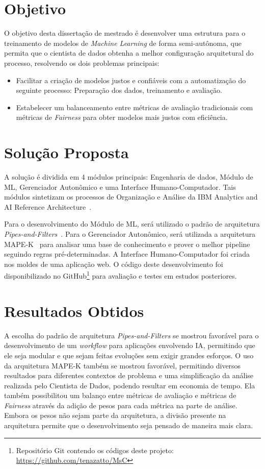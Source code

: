 \documentclass[portugues]{ic-tese}
\begin{document}
\section{Objetivo}

O objetivo desta dissertação de mestrado é desenvolver uma estrutura para o treinamento de modelos de \textit{Machine Learning} de forma semi-autônoma, que permita que o cientista de dados obtenha a melhor configuração arquitetural do processo, resolvendo os dois problemas principais:

\begin{itemize}
\item Facilitar a criação de modelos justos e confiáveis com a automatização do seguinte processo: Preparação dos dados, treinamento e avaliação.
\item Estabelecer um balanceamento entre métricas de avaliação tradicionais com métricas de \textit{Fairness} para obter modelos mais justos com eficiência.
\end{itemize}

\section{Solução Proposta}

A solução é dividida em 4 módulos principais: Engenharia de dados, Módulo de ML, Gerenciador Autonômico e uma Interface Humano-Computador. Tais módulos sintetizam os processos de Organização e Análise da IBM Analytics and AI Reference Architecture~\citep{IBM_2021}.

Para o desenvolvimento do Módulo de ML, será utilizado o padrão de arquitetura \textit{Pipes-and-Filters}~\citep{Garlan_1993}. Para o Gerenciador Autonômico, será utilizada a arquitetura MAPE-K~\citep{IBM_2005} para analisar uma base de conhecimento e prover o melhor pipeline seguindo regras pré-determinadas. A Interface Humano-Computador foi criada nos moldes de uma aplicação web. O código deste desenvolvimento foi disponibilizado no GitHub\footnote{Repositório Git contendo os códigos deste projeto: \url{https://github.com/tenazatto/MsC}} para avaliação e testes em estudos posteriores.

\section{Resultados Obtidos}

A escolha do padrão de arquitetura \textit{Pipes-and-Filters} se mostrou favorável para o desenvolvimento de um \textit{workflow} para aplicações envolvendo IA, permitindo que ele seja modular e que sejam feitas evoluções sem exigir grandes esforços. O uso da arquitetura MAPE-K também se mostrou favorável, permitindo diversos resultados para diferentes contextos de problema e uma simplificação da análise realizada pelo Cientista de Dados, podendo resultar em economia de tempo. Ela também possibilitou um balanço entre métricas de avaliação e métricas de \textit{Fairness} através da adição de pesos para cada métrica na parte de análise. Embora os pesos não sejam parte da arquitetura, a divisão presente na arquitetura permite que o desenvolvimento seja pensado de maneira mais clara.
\end{document}
